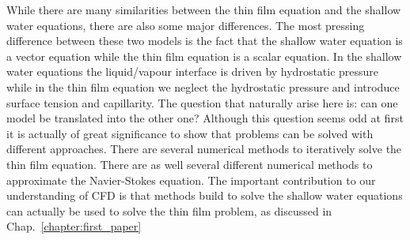 While there are many similarities between the thin film equation and the shallow water equations, there are also some major differences.
The most pressing difference between these two models is the fact that the shallow water equation is a vector equation while the thin film equation is a scalar equation.
In the shallow water equations the liquid/vapour interface is driven by hydrostatic pressure while in the thin film equation we neglect the hydrostatic pressure and introduce surface tension and capillarity.
The question that naturally arise here is: can one model be translated into the other one?
Although this question seems odd at first it is actually of great significance to show that problems can be solved with different approaches.
There are several numerical methods to iteratively solve the thin film equation.
There are as well several different numerical methods to approximate the Navier-Stokes equation.
The important contribution to our understanding of CFD is that methods build to solve the shallow water equations can actually be used to solve the thin film problem, as discussed in Chap.~\ref{chapter:first_paper}